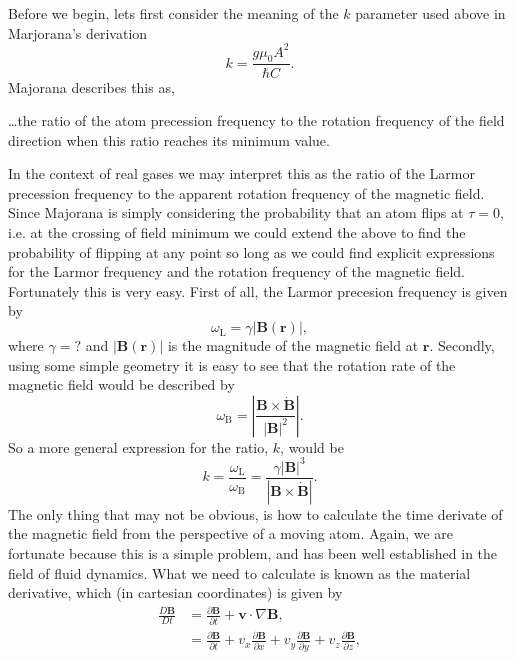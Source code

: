 Before we begin, lets first consider the meaning of the $k$ parameter used above in Marjorana's derivation
\begin{equation}
    k = \frac{g \mu_{0} A^2} {\hbar C}.
\end{equation}
Majorana describes this as, 
\begin{displayquote}
    \dots the ratio of the atom precession frequency to the rotation frequency of the field direction when this ratio reaches its minimum value.
\end{displayquote}
In the context of real gases we may interpret this as the ratio of the Larmor precession frequency to the apparent rotation frequency of the magnetic field.
Since Majorana is simply considering the probability that an atom flips at $\tau = 0$, i.e. at the crossing of field minimum we could extend the above to find the probability of flipping at any point so long as we could find explicit expressions for the Larmor frequency and the rotation frequency of the magnetic field.
Fortunately this is very easy.
First of all, the Larmor precesion frequency is given by
\begin{equation}
    \omega_{\textrm{L}} = \gamma \vert \mathbf{B}(\mathbf{r}) \vert,
\end{equation}
where $\gamma = ?$ and $\vert \mathbf{B}(\mathbf{r}) \vert$ is the magnitude of the magnetic field at $\mathbf{r}$.
Secondly, using some simple geometry it is easy to see that the rotation rate of the magnetic field would be described by
\begin{equation}
    \omega_\mathrm{B} = \left \vert \frac{\mathbf{B} \times \dot{ \mathbf{B} } } { \left \vert \mathbf{B} \right \vert ^ 2} \right \vert.
\end{equation}
So a more general expression for the ratio, $k$, would be
\begin{equation}
    k = \frac{\omega_\textrm{L}}{\omega_\textrm{B}} = \frac{\gamma \left\vert \mathbf{B} \right\vert^3}{\left\vert \mathbf{B} \times \dot{ \mathbf{B} }\right \vert }.
\end{equation}
The only thing that may not be obvious, is how to calculate the time derivate of the magnetic field from the perspective of a moving atom.
Again, we are fortunate because this is a simple problem, and has been well established in the field of fluid dynamics.
What we need to calculate is known as the material derivative, which (in cartesian coordinates) is given by
\begin{align}
    \frac{D \mathbf{B}}{Dt} &= \frac{\partial \mathbf{B}}{\partial t} + \mathbf{v} \cdot \nabla \mathbf{B},\\
    &= \frac{\partial \mathbf{B}}{\partial t} + v_x  \frac{\partial \mathbf{B}}{\partial x} + v_y \frac{\partial \mathbf{B}}{\partial y} + v_z \frac{\partial \mathbf{B}}{\partial z}, \label{eq:majorana_surface}
\end{align}
